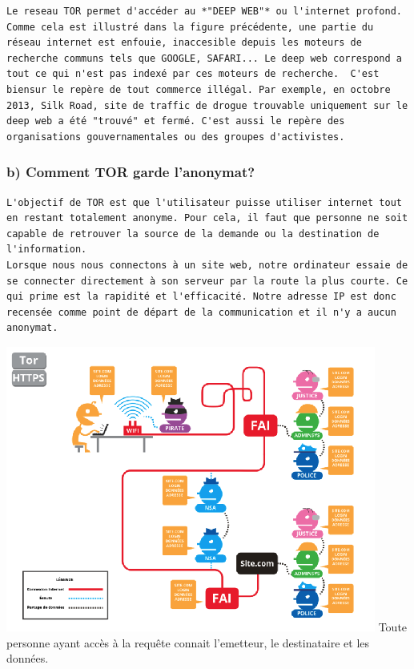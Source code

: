 \documentclass[]{article}
\begin{document}
\begin{verbatim}
Le reseau TOR permet d'accéder au *"DEEP WEB"* ou l'internet profond. Comme cela est illustré dans la figure précédente, une partie du réseau internet est enfouie, inaccesible depuis les moteurs de recherche communs tels que GOOGLE, SAFARI... Le deep web correspond a tout ce qui n'est pas indexé par ces moteurs de recherche.  C'est biensur le repère de tout commerce illégal. Par exemple, en octobre 2013, Silk Road, site de traffic de drogue trouvable uniquement sur le deep web a été "trouvé" et fermé. C'est aussi le repère des organisations gouvernamentales ou des groupes d'activistes.
\end{verbatim}

\subsubsection{b) Comment TOR garde
l'anonymat?}\label{b-comment-tor-garde-lanonymat}

\begin{verbatim}
L'objectif de TOR est que l'utilisateur puisse utiliser internet tout en restant totalement anonyme. Pour cela, il faut que personne ne soit capable de retrouver la source de la demande ou la destination de l'information.
Lorsque nous nous connectons à un site web, notre ordinateur essaie de se connecter directement à son serveur par la route la plus courte. Ce qui prime est la rapidité et l'efficacité. Notre adresse IP est donc recensée comme point de départ de la communication et il n'y a aucun anonymat.
\end{verbatim}

\includegraphics{images/Connexion_classique.png} Toute personne ayant
accès à la requête connait l'emetteur, le destinataire et les données.
\end{document}
